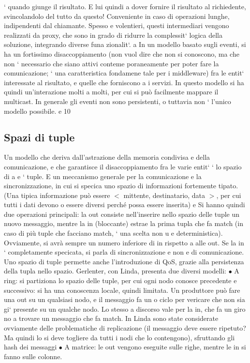 \documentclass[a4paper,12pt]{article}
\begin{document}
`
quando giunge il risultato. E lui quindi a dover fornire il risultato al
richiedente, svincolandolo del tutto da questo! Conveniente in caso di
operazioni lunghe, indipendenti dal chiamante.
Spesso e volentieri, questi intermediari vengono realizzati da proxy, che sono in
grado di ridurre la complessit` logica della soluzione, integrando diverse funa
zionalit`.
a
In un modello basato sugli eventi, si ha un fortissimo disaccoppiamento (non
vuol dire che non si conoscono, ma che non ` necessario che siano attivi conteme
poraneamente per poter fare la comunicazione; ` una caratteristica fondamene
tale per i middleware) fra le entit` interessate al risultato, e quelle che forniscono
a
i servizi. In questo modello si ha quindi un'interazione molti a molti, per cui si
può facilmente mappare il multicast. In generale gli eventi non sono persistenti,
o
tuttavia non ` l'unico modello possibile.
e
10
\subsection{Spazi di tuple}
Un modello che deriva dall'astrazione della memoria condivisa e della comunicazione, e che garantisce il
disaccoppiamento fra le varie entit` ` lo spazio di
a e
`
tuple. E un meccanismo generale per la comunicazione e la sincronizzazione, in
cui si specica uno spazio di informazioni fortemente tipato. (Una tipica informazione può essere $<$ mittente,
destinatario, data $>$, per cui tutti i dati devono
o
essere diversi perché possa essere inserita)
e
Si hanno quindi due operazioni principali: la out consiste nell'inserire nello
spazio delle tuple un nuovo messaggio, mentre la in (bloccante) estrae la prima
tupla che fa match (in caso di più tuple che facciano match, ` una scelta non
u
e
deterministica). Ovviamente, si avrà sempre un numero inferiore di in rispetto
a
alle out. Se la in ` completamente specicata, si parla di sincronizzazione e non
e
di comunicazione. Uno spazio di tuple permette anche l'introduzione di QoS,
grazie alla persistenza della tupla nello spazio.
Gerlenter, con Linda, presenta due diversi modelli:
$\bullet$ A ring: si partiziona lo spazio delle tuple, per cui ogni nodo conosce
precedente e successivo: si ha una conoscenza locale, quindi limitata. Un
produttore può fare una out su un qualsiasi nodo, e il messaggio fa un
o
ciclo per vericare che non sia gi` presente su un qualche nodo. Lo stesso
a
discorso vale per la in, che fa un giro no a trovare un messaggio che fa
match. In Linda sono state considerate ovviamente delle problematiche
di replicazione (il messaggio deve essere ripetuto? Ma quindi lo si deve
togliere da tutti i nodi che lo contengono), sfruttando gli hash dei messaggi
$\bullet$ A matrice: le out vengono eseguite sulle righe, mentre le in si fanno sulle
colonne.
\end{document}
